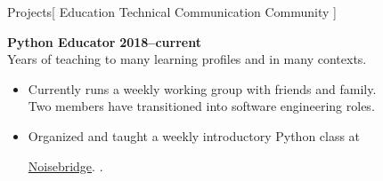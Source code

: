 \documentclass[11pt,a4paper]{article}
\newenvironment{worksection}[3]{
    \begin{addmargin}[0.5em]{0em}
    {\large\bfseries #1} \hfill {\bfseries #2}\\%
    \hspace*{0ex}#3
    \begin{itemize}
        [label=-, topsep=0pt, itemsep=0.5ex, parsep=0pt, leftmargin=1em]
}{
    \end{itemize}
    \end{addmargin}
    \medskip
}
\newcommand{\archive}{https://web.archive.org/web}
\newcommand{\FadleyGroup}{
  \href{\archive/20201001085257/http://fadley.physics.ucdavis.edu/}
       {Fadley Group}
}
\newcommand{\Noisebridge}{
  \href{https://www.noisebridge.net/}{Noisebridge}.
}
\begin{document}

\begin{mysection}{Projects}[
    Education \textbullet{} Technical Communication \textbullet{} Community
]

\begin{worksection}
     {Python Educator}
     {2018--current}
     {Years of teaching to many learning profiles and in many contexts.}
    \item Currently runs a weekly working group with friends and family.
    \\    Two members have transitioned into software engineering roles.
    \item Organized and taught a weekly introductory Python class at
          \Noisebridge{}.

  \end{worksection}


\end{mysection}
\end{document}

